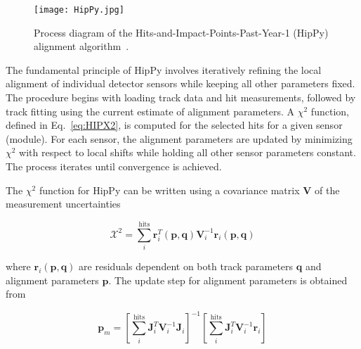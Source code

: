 \begin{figure}[!hbt]
    \begin{center}
        \texttt{[image: HipPy.jpg]}
        \caption{Process diagram of the Hits-and-Impact-Points-Past-Year-1 (HipPy) alignment algorithm~\cite{2022166795}.}
        \label{fig:HipPy}
    \end{center}
\end{figure}

The fundamental principle of HipPy involves iteratively refining the local alignment of individual detector sensors while keeping all other parameters fixed. The procedure begins with loading track data and hit measurements, followed by track fitting using the current estimate of alignment parameters. A \(\chi^2\) function, defined in Eq.~\eqref{eq:HIPX2}, is computed for the selected hits for a given sensor (module). For each sensor, the alignment parameters are updated by minimizing \(\chi^2\) with respect to local shifts while holding all other sensor parameters constant. The process iterates until convergence is achieved.



The \(\chi^2\) function for HipPy can be written using a covariance matrix \(\mathbf{V}\) of the measurement uncertainties

\begin{equation}
\label{eq:HIPX2}
\mathcal{X}^2 = \sum_{i}^{\text{hits}} \mathbf{r}_i^T(\mathbf{p}, \mathbf{q}) \mathbf{V}_i^{-1} \mathbf{r}_i(\mathbf{p}, \mathbf{q})
\end{equation}

where \(\mathbf{r}_i(\mathbf{p}, \mathbf{q})\) are residuals dependent on both track parameters \(\mathbf{q}\) and alignment parameters \(\mathbf{p}\). The update step for alignment parameters is obtained from

\begin{equation}
\label{eq:HPpm}
\mathbf{p}_m = \left[\sum_{i}^{\text{hits}} \mathbf{J}_i^T \mathbf{V}_i^{-1} \mathbf{J}_i\right]^{-1} \left[\sum_{i}^{\text{hits}} \mathbf{J}_i^T \mathbf{V}_i^{-1} \mathbf{r}_i\right]
\end{equation}

